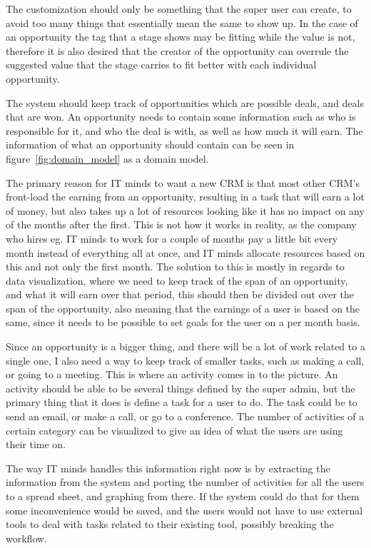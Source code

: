 The customization should only be something that the super user can create, to
avoid too many things that essentially mean the same to show up. In the case of
an opportunity the tag that a stage shows may be fitting while the value is not,
therefore it is also desired that the creator of the opportunity can overrule
the suggested value that the stage carries to fit better with each individual
opportunity. 

The system should keep track of opportunities which are possible deals, and
deals that are won. An opportunity needs to contain some information such as who
is responsible for it, and who the deal is with, as well as how much it will
earn. The information of what an opportunity should contain can be seen in
figure~\ref{fig:domain_model} as a domain model.

The primary reason for IT minds to want a new CRM is that most other CRM's
front-load the earning from an opportunity, resulting in a task that will
earn a lot of money, but also takes up a lot of resources looking like it has no
impact on any of the months after the first. This is not how it works in
reality, as the company who hires eg. IT minds to work for a couple of months
pay a little bit every month instead of everything all at once, and IT minds
allocate resources based on this and not only the first month. The solution to
this is mostly in regards to data visualization, where we need to keep track of
the span of an opportunity, and what it will earn over that period, this should
then be divided out over the span of the opportunity, also meaning that the
earnings of a user is based on the same, since it needs to be possible to set
goals for the user on a per month basis. 

Since an opportunity is a bigger thing, and there will be a lot of work related
to a single one, I also need a way to keep track of smaller tasks, such as
making a call, or going to a meeting. This is where an activity comes in to the
picture. An activity should be able to be several things defined by the super
admin, but the primary thing that it does is define a task for a user to do. The
task could be to send an email, or make a call, or go to a conference. The
number of activities of a certain category can be visualized to give an idea of
what the users are using their time on. 

The way IT minds handles this information right now is by extracting the
information from the system and porting the number of activities for all the users
to a spread sheet, and graphing from there. If the system could do that for
them some inconvenience would be saved, and the users would not have to use
external tools to deal with tasks related to their existing tool, possibly
breaking the workflow.

